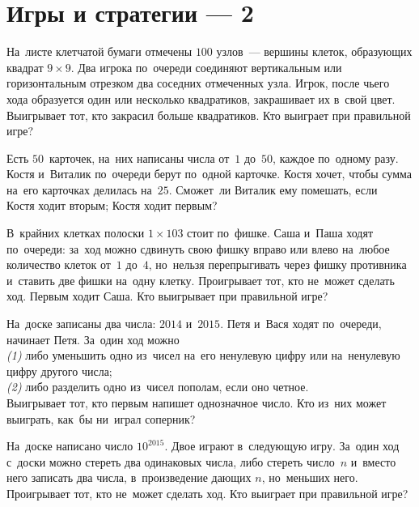 
\section*{Игры и стратегии --- 2}


\begin{problems}

\item
На~листе клетчатой бумаги отмечены $100$ узлов~--- вершины клеток, образующих
квадрат $9 \times 9$.
Два игрока по~очереди соединяют вертикальным или горизонтальным отрезком два
соседних отмеченных узла.
Игрок, после чьего хода образуется один или несколько квадратиков, закрашивает
их в~свой цвет.
Выигрывает тот, кто закрасил больше квадратиков.
Кто выиграет при правильной игре?

\item
Есть $50$~карточек, на~них написаны числа от~$1$ до~$50$, каждое по~одному
разу.
Костя и~Виталик по~очереди берут по~одной карточке.
Костя хочет, чтобы сумма на~его карточках делилась на~$25$.
Сможет~ли Виталик ему помешать,
если
\\
\subproblem Костя ходит вторым;
\qquad
\subproblem Костя ходит первым?

\item
В~крайних клетках полоски $1 \times 103$ стоит по~фишке.
Саша и~Паша ходят по~очереди: за~ход можно сдвинуть свою фишку вправо или влево
на~любое количество клеток от~$1$ до~$4$, но~нельзя перепрыгивать через фишку
противника и~ставить две фишки на~одну клетку.
Проигрывает тот, кто не~может сделать ход.
Первым ходит Саша.
Кто выигрывает при правильной игре?

\item
На~доске записаны два числа: $2014$ и~$2015$.
Петя и~Вася ходят по~очереди, начинает Петя.
За~один ход можно
\\
\textit{(1)}
либо уменьшить одно из~чисел на~его ненулевую цифру или на~ненулевую цифру
другого числа;
\\
\textit{(2)}
либо разделить одно из~чисел пополам, если оно четное.
\\
Выигрывает тот, кто первым напишет однозначное число.
Кто из~них может выиграть, как~бы ни~играл соперник?

\item
На~доске написано число $10^{2015}$.
Двое играют в~следующую игру.
За~один ход с~доски можно стереть два одинаковых числа, либо стереть число~$n$
и~вместо него записать два числа, в~произведение дающих $n$, но~меньших него.
Проигрывает тот, кто не~может сделать ход.
Кто выиграет при правильной игре?


\end{problems}

